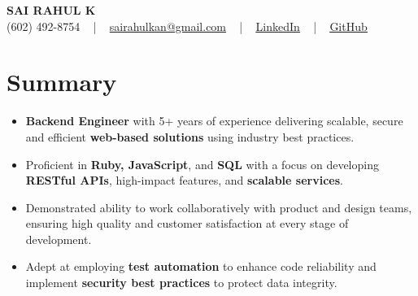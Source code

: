 \documentclass[letterpaper,11pt]{article}
\newcommand{\resumeItem}[1]{
  \item\footnotesize{
    {#1 \vspace{-2pt}}
  }
}
\newcommand{\resumeItemListStart}{\begin{itemize}[leftmargin=*]}
\newcommand{\resumeItemListEnd}{\end{itemize}\vspace{-5pt}}
\begin{document}
\begin{center}
    {\fontsize{14pt}{12pt}\selectfont \textbf{\MakeUppercase{Sai Rahul K}}}\\ \vspace{2pt}
    \fontsize{10pt}{12pt}\selectfont (602) 492-8754 ~ | ~ \href{mailto:sairahulkan@gmail.com}{sairahulkan@gmail.com} ~ | ~
    \href{https://www.linkedin.com/in/rq123/}{\color{blue}\underline{LinkedIn}} ~ | ~
    \href{https://github.com/kanrahuldo}{\color{blue}\underline{GitHub}}~
    \vspace{-8pt}
\end{center}

\section{Summary}
\fontsize{9pt}{10pt}\selectfont
\resumeItemListStart
    \resumeItem{\textbf{Backend Engineer} with 5+ years of experience delivering scalable, secure and efficient \textbf{web-based solutions} using industry best practices.} \vspace{-3pt}
    \resumeItem{Proficient in \textbf{Ruby, JavaScript}, and \textbf{SQL} with a focus on developing \textbf{RESTful APIs}, high-impact features, and \textbf{scalable services}.} \vspace{-3pt}
    \resumeItem{Demonstrated ability to work collaboratively with product and design teams, ensuring high quality and customer satisfaction at every stage of development.} \vspace{-3pt}
    \resumeItem{Adept at employing \textbf{test automation} to enhance code reliability and implement \textbf{security best practices} to protect data integrity.} \vspace{-3pt}
\resumeItemListEnd
\vspace{-6pt}
\end{document}
